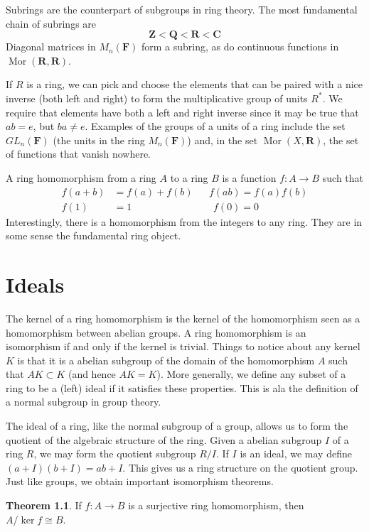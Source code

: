 \documentclass[12pt]{amsbook}
\theoremstyle{definition}
\newtheorem{theorem}{Theorem}[chapter]
\newcommand{\Mor}{\operatorname{Mor}}
\begin{document}
Subrings are the counterpart of subgroups in ring theory. The most fundamental chain of subrings are
%
\[ \mathbf{Z} < \mathbf{Q} < \mathbf{R} < \mathbf{C} \]
%
Diagonal matrices in $M_n(\mathbf{F})$ form a subring, as do continuous functions in $\Mor(\mathbf{R}, \mathbf{R})$.

If $R$ is a ring, we can pick and choose the elements that can be paired with a nice inverse (both left and right) to form the multiplicative group of units $R^*$. We require that elements have both a left and right inverse since it may be true that $ab = e$, but $ba \neq e$. Examples of the groups of a units of a ring include the set $GL_n(\mathbf{F})$ (the units in the ring $M_n(\mathbf{F})$) and, in the set $\Mor(X, \mathbf{R})$, the set of functions that vanish nowhere.

A ring homomorphism from a ring $A$ to a ring $B$ is a function $f:A \to B$ such that
%
\begin{align*}
    f(a + b) &= f(a) + f(b) && f(ab) = f(a)f(b)\\
    f(1) &= 1 && \ \ f(0) = 0
\end{align*}
%
Interestingly, there is a homomorphism from the integers to any ring. They are in some sense the fundamental ring object.

\chapter{Ideals}

The kernel of a ring homomorphism is the kernel of the homomorphism seen as a homomorphism between abelian groups. A ring homomorphism is an isomorphism if and only if the kernel is trivial. Things to notice about any kernel $K$ is that it is a abelian subgroup of the domain of the homomorphism $A$ such that $AK \subset K$ (and hence $AK = K$). More generally, we define any subset of a ring to be a (left) ideal if it satisfies these properties. This is ala the definition of a normal subgroup in group theory.

The ideal of a ring, like the normal subgroup of a group, allows us to form the quotient of the algebraic structure of the ring. Given a abelian subgroup $I$ of a ring $R$, we may form the quotient subgroup $R/I$. If $I$ is an ideal, we may define $(a + I)(b + I) = ab + I$. This gives us a ring structure on the quotient group. Just like groups, we obtain important isomorphism theorems.

\begin{theorem}
    If $f:A \to B$ is a surjective ring homomorphism, then $A/\ker f \cong B$.
\end{theorem}
\end{document}
